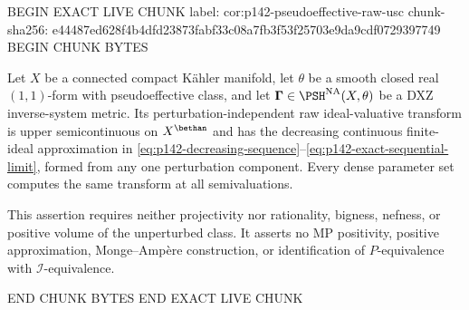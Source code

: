 BEGIN EXACT LIVE CHUNK
label: cor:p142-pseudoeffective-raw-usc
chunk-sha256: e44487ed628f4b4dfd23873fabf33c08a7fb3f53f25703e9da9cdf0729397749
BEGIN CHUNK BYTES
\begin{corollary}\label{cor:p142-pseudoeffective-raw-usc}
Let $X$ be a connected compact K\"ahler manifold, let $\theta$ be a
smooth closed real $(1,1)$-form with pseudoeffective class, and let
$\boldsymbol\Gamma\in\PSH^{\mathrm{NA}}(X,\theta)$ be a DXZ
inverse-system metric. Its perturbation-independent raw ideal-valuative
transform is upper semicontinuous on $X^{\bethan}$ and has the decreasing
continuous finite-ideal approximation in
\eqref{eq:p142-decreasing-sequence}--\eqref{eq:p142-exact-sequential-limit},
formed from any one perturbation component. Every dense parameter set
computes the same transform at all semivaluations.

This assertion requires neither projectivity nor rationality, bigness,
nefness, or positive volume of the unperturbed class. It asserts no MP
positivity, positive approximation, Monge--Amp\`ere construction, or
identification of $P$-equivalence with $\mathcal I$-equivalence.
\end{corollary}
END CHUNK BYTES
END EXACT LIVE CHUNK
